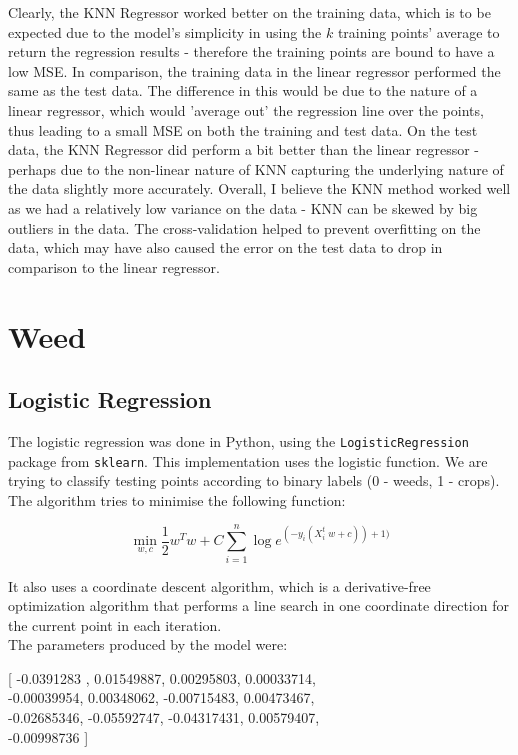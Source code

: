 \documentclass{scrartcl}
\begin{document}
Clearly, the KNN Regressor worked better on the training data, which is to be expected due to the model's simplicity in using the $k$ training points' average to return the regression results - therefore the training points are bound to have a low MSE. In comparison, the training data in the linear regressor performed the same as the test data. The difference in this would be due to the nature of a linear regressor, which would 'average out' the regression line over the points, thus leading to a small MSE on both the training and test data. On the test data, the KNN Regressor did perform a bit better than the linear regressor - perhaps due to the non-linear nature of KNN capturing the underlying nature of the data slightly more accurately. Overall, I believe the KNN method worked well as we had a relatively low variance on the data - KNN can be skewed by big outliers in the data. The cross-validation helped to prevent overfitting on the data, which may have also caused the error on the test data to drop in comparison to the linear regressor.

\newpage
\section{Weed}

\subsection{Logistic Regression}
The logistic regression was done in Python, using the \texttt{LogisticRegression} package from \texttt{sklearn}. This implementation uses the logistic function. We are trying to classify testing points according to binary labels (0 - weeds, 1 - crops). The algorithm tries to minimise the following function:

\[ \min_{w, c} \frac{1} {2} w^T w + C \sum^n_{i=1} \log e ^{(-y_i(X^t_i \; w + c)) +1)} \]

It also uses a coordinate descent algorithm, which is a derivative-free optimization algorithm that performs a line search in one coordinate direction for the current point in each iteration. \cite{wiki:cd} \\

The parameters produced by the model were:

\begin{center}
[  -0.0391283 ,  0.01549887,  0.00295803,  0.00033714, \\
   -0.00039954,  0.00348062, -0.00715483,  0.00473467, \\
   -0.02685346, -0.05592747, -0.04317431,  0.00579407, \\
  -0.00998736
]
\end{center}
\end{document}
